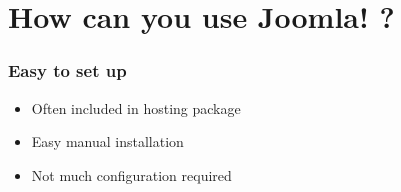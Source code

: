 \section{How can you use Joomla! ?}
\setcounter{subsection}{1}

\begin{frame}
\frametitle{Easy to set up}
  \begin{itemize}[<+->]
    \item Often included in hosting package
    \item Easy manual installation
    \item Not much configuration required
  \end{itemize}
\end{frame}
